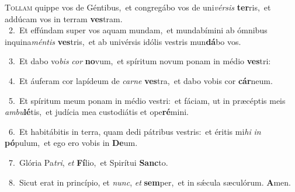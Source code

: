 \lettrine{\initial\textcolor{\initialcolor}{T}}{ollam} quippe vos de Géntibus,~\dagger et congregábo vos de uni\-\textit{vér}\-\textit{sis} \textbf{ter}\-ris,~\star et addúcam vos in terram \textbf{ves}\-tram.\\
{\numbfont\textcolor{\numbcolor}{~2.}}~Et effúndam super vos aquam mundam,~\dagger et mundabímini ab ómnibus inquina\-\textit{mén}\-\textit{tis} \textbf{ves}\-tris,~\star et ab univérsis idólis vestris mun\-\textbf{dá}\-bo vos.\par
{\numbfont\textcolor{\numbcolor}{~3.}}~Et dabo vo\textit{bis} \textit{cor} \textbf{no}\-vum,~\star et spíritum novum ponam in médio \textbf{ves}\-tri:\par
{\numbfont\textcolor{\numbcolor}{~4.}}~Et áuferam cor lapídeum de \textit{car}\-\textit{ne} \textbf{ves}\-tra,~\star et dabo vobis cor \textbf{cár}\-neum.\par
{\numbfont\textcolor{\numbcolor}{~5.}}~Et spíritum meum ponam in médio vestri:~\dagger et fáciam, ut in præcéptis meis \textit{am}\-\textit{bu}\textbf{lé}tis,~\star et judícia mea custodiátis et ope\-\textbf{ré}\-mini.\par
{\numbfont\textcolor{\numbcolor}{~6.}}~Et habitábitis in terra, quam dedi pátribus vestris:~\dagger et éritis mi\textit{hi} \textit{in} \textbf{pó}\-pulum,~\star et ego ero vobis in \textbf{De}\-um.\par
{\numbfont\textcolor{\numbcolor}{~7.}}~Glória Pa\-\textit{tri}\-, \textit{et} \textbf{Fí}\-lio,~\star et Spirítui \textbf{Sanc}\-to.\par
{\numbfont\textcolor{\numbcolor}{~8.}}~Sicut erat in princípio, et \textit{nunc}\-, \textit{et} \textbf{sem}\-per,~\star et in sǽcula sæculórum. \textbf{A}\-men.\par

